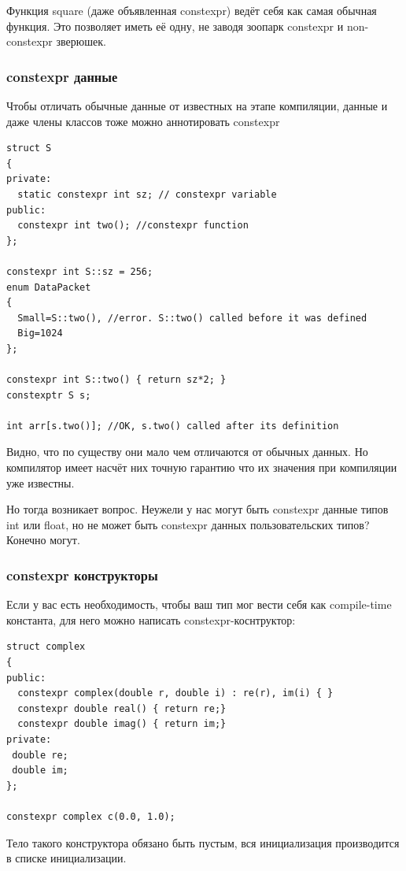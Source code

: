 \documentclass[a4paper,12pt,oneside]{article}
\begin{document}
Функция square (даже объявленная constexpr) ведёт себя как самая обычная функция. Это позволяет иметь её одну, не заводя зоопарк constexpr и non-constexpr зверюшек.

\subsubsection{constexpr данные}

Чтобы отличать обычные данные от известных на этапе компиляции, данные и даже члены классов тоже можно аннотировать constexpr

\begin{lstlisting}
struct S
{
private:
  static constexpr int sz; // constexpr variable
public:
  constexpr int two(); //constexpr function
};

constexpr int S::sz = 256;
enum DataPacket
{
  Small=S::two(), //error. S::two() called before it was defined
  Big=1024
};

constexpr int S::two() { return sz*2; }
constexptr S s;

int arr[s.two()]; //OK, s.two() called after its definition
\end{lstlisting}

Видно, что по существу они мало чем отличаются от обычных данных. Но компилятор имеет насчёт них точную гарантию что их значения при компиляции уже известны.

Но тогда возникает вопрос. Неужели у нас могут быть constexpr данные типов int или float, но не может быть constexpr данных пользовательских типов? Конечно могут.

\subsubsection{constexpr конструкторы}

Если у вас есть необходимость, чтобы ваш тип мог вести себя как compile-time константа, для него можно написать constexpr-коснтруктор:

\begin{lstlisting}
struct complex
{
public:
  constexpr complex(double r, double i) : re(r), im(i) { }
  constexpr double real() { return re;}
  constexpr double imag() { return im;}
private:
 double re;
 double im;
};

constexpr complex c(0.0, 1.0);
\end{lstlisting}

Тело такого конструктора обязано быть пустым, вся инициализация производится в списке инициализации.
\end{document}
